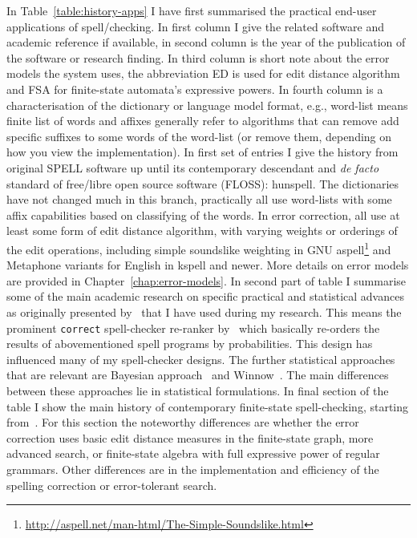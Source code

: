 \documentclass[officiallayout]{unihelcompling}
\begin{document}
In Table~\ref{table:history-apps} I have first summarised the practical
end-user applications of spell\-/checking. In first column I give the
related software and academic reference if available, in second column is the
year of the publication of the software or research finding. In third column
is short note about the error models the system uses, the abbreviation ED is
used for edit distance algorithm and FSA for finite-state automata's 
expressive powers. In fourth column is a characterisation of the dictionary
or language model format, e.g., word-list means finite list of words and 
affixes generally refer to algorithms that can remove add specific suffixes to
some words of the word-list (or remove them, depending on how you view the
implementation).
In first set of entries I give the history from original SPELL software up
until its contemporary descendant and \emph{de facto} standard of
free/libre open source software (FLOSS): hunspell. The dictionaries have
not changed much in this branch, practically all use word-lists with some
affix capabilities based on classifying of the words. In error correction,
all use at least some form of edit distance algorithm, with varying weights
or orderings of the edit operations, including simple soundslike weighting
in GNU aspell\footnote{\url{http://aspell.net/man-html/The-Simple-Soundslike.html}} and Metaphone variants for English in kspell and newer. More details on
error models are provided in  Chapter~\ref{chap:error-models}.
In second part of table I summarise some of the main academic research
on specific practical and statistical advances as originally presented
by~\citet{al2006learning} that I have used during my research. This means the
prominent \texttt{correct} spell-checker re-ranker by~\citet{church1991probability} which basically re-orders the results of abovementioned spell programs by
probabilities. This design has influenced many of my spell-checker designs.
The further statistical approaches that are relevant are Bayesian 
approach~\citep{golding1995bayesian} and Winnow~\citep{golding1999winnow}. The
main differences between these approaches lie in statistical formulations.
In final section of the table I show the main history of contemporary 
finite-state spell-checking, starting from~\citet{oflazer1996errortolerant}.
For this section the noteworthy differences are whether the error correction
uses basic edit distance measures in the finite-state graph, more advanced
search, or finite-state algebra with full expressive power of regular grammars.
Other differences are in the implementation and efficiency of the
spelling correction or error-tolerant search.
\end{document}
